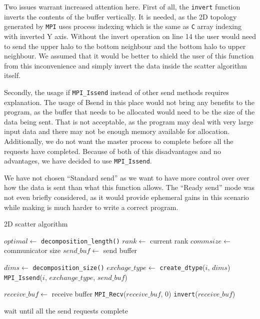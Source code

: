 \documentclass[11pt,a4paper]{article}
\begin{document}
Two issues warrant increased attention here. 
First of all, the \texttt{invert} function inverts the contents of the buffer vertically. 
It is needed, as the 2D topology generated by \texttt{MPI} uses process indexing which is the same as \texttt{C} array indexing with inverted Y axis. 
Without the invert operation on line 14 the user would need to send the upper halo to the bottom neighbour and the bottom halo to upper neighbour. 
We assumed that it would be better to shield the user of this function from this inconvenience and simply invert the data inside the scatter algorithm itself. 

Secondly, the usage if \texttt{MPI\_Issend} instead of other send methods requires explanation. 
The usage of Bsend in this place would not bring any benefits to the program, as the buffer that needs to be allocated would need to be the size of the data being sent. 
That is not acceptable, as the program may deal with very large input data and there may not be enough memory available for allocation. 
Additionally, we do not want the master process to complete before all the requests have completed. 
Because of both of this disadvantages and no advantages, we have decided to use \texttt{MPI\_Issend}.

We have not chosen ``Standard send'' as we want to have more control over over how the data is sent than what this function allows. 
The ``Ready send'' mode was not even briefly considered, as it would provide ephemeral gains in this scenario while making is much harder to write a correct program.
\begin{algorithm}
    \caption{2D scatter algorithm}\label{2dscat}
    \begin{algorithmic}[1]
        \State $optimal\gets$ \texttt{decomposition\_length()}
        \State $rank\gets$ current rank
        \State $commsize\gets$ communicator size
        \State $send\_buf\gets$ send buffer

        \State $dims\gets$ \texttt{decomposition\_size()}
                \State $exchage\_type\gets$ \texttt{create\_dtype}($i$, $dims$)
                \State \texttt{MPI\_Issend}($i$, $exchange\_type$, $send\_buf$)
            \EndFor
        \EndIf

        \State $receive\_buf\gets$ receive buffer
        \State \texttt{MPI\_Recv}($receive\_buf$, $0$)
        \State \texttt{invert}($receive\_buf$)

            wait until all the send requests complete
        \EndIf
    \end{algorithmic}
\end{algorithm}
\end{document}
